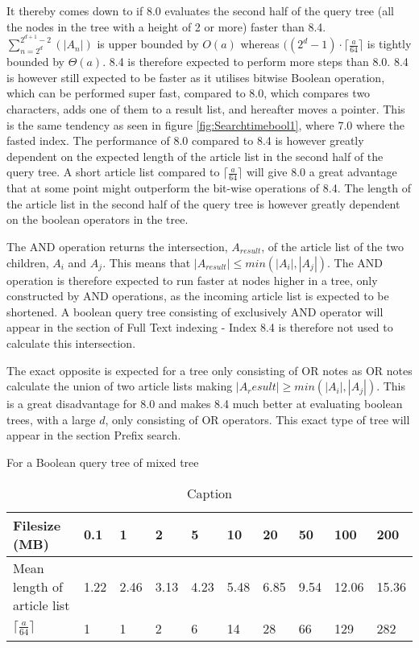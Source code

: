 It thereby comes down to if 8.0 evaluates the second half of the query tree (all the nodes in the tree with a height of 2 or more) faster than 8.4.  $\sum_{n=2^d}^{2^{d+1}-2}(|A_n|)$ is upper bounded by $O(a)$ whereas $((2^{d}-1) \cdot \lceil \frac{a}{64} \rceil$ is tightly bounded by $\Theta(a)$. 8.4 is therefore expected to perform more steps than 8.0. 8.4 is however still expected to be faster as it utilises bitwise Boolean operation, which can be performed super fast, compared to 8.0, which compares two characters, adds one of them to a result list, and hereafter moves a pointer. This is the same tendency as seen in figure \ref{fig:Searchtimebool1}, where 7.0 where the fasted index. The performance of 8.0 compared to 8.4 is however greatly dependent on the expected length of the article list in the second half of the query tree. A short article list compared to $\lceil \frac{a}{64} \rceil$ will give 8.0 a great advantage that at some point might outperform the bit-wise operations of 8.4. The length of the article list in the second half of the query tree is however greatly dependent on the boolean operators in the tree. 

The AND operation returns the intersection, $A_{result}$, of the article list of the two children, $A_i$ and $A_j$. This means that $|A_{result}|\leq min(|A_i|,|A_j|)$. The AND operation is therefore expected to run faster at nodes higher in a tree, only constructed by AND operations, as the incoming article list is expected to be shortened. A boolean query tree consisting of exclusively AND operator will appear in the section of Full Text indexing - Index 8.4 is therefore not used to calculate this intersection.

The exact opposite is expected for a tree only consisting of OR notes as OR notes calculate the union of two article lists making $|A_result|\geq min(|A_i|,|A_j|)$. This is a great disadvantage for 8.0 and makes 8.4 much better at evaluating boolean trees, with a large $d$, only consisting of OR operators. This exact type of tree will appear in the section Prefix search.

For a Boolean query tree of mixed tree 


\begin{table}[H]
\begin{tabular}{l|lllllllll}
 Filesize (MB)                           & 0.1 & 1     & 2      & 5      & 10 & 20     & 50     & 100 & 200 \\
 \hline 
Mean length of article list &  1.22   & 2.46     & 3.13      & 4.23      & 5.48      &  6.85     &  9.54    &  12.06      &  15.36      \\
  $\lceil \frac{a}{64} \rceil$                          &  1      & 1        & 2         &  6        & 14      &  28       &  66     & 129     &  282    
\end{tabular}
\caption{Caption}
\label{fig: Searchtimebool7}
\end{table}

